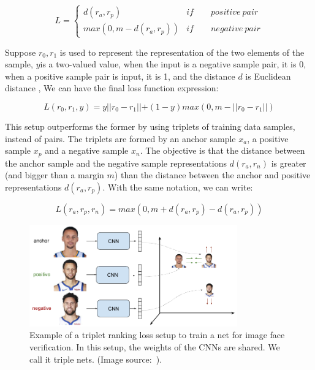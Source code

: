 \begin{equation}
L=\begin{cases}
	d(r_a,r_p) & if \qquad positive\ pair \\
	max(0,m-d(r_a,r_p)) & if \qquad negative\  pair
\end{cases}
\end{equation}

Suppose $r_0,r_1 $ is used to represent the representation of the two elements of the sample, $y$is a two-valued value, when the input is a negative sample pair, it is 0, when a positive sample pair is input, it is 1, and the distance $d$ is Euclidean distance , We can have the final loss function expression:

\begin{equation}
L(r_0,r_1,y)=y\left || r_0-r_1 \right || + (1-y)max(0,m-\left || r_0-r_1 \right ||)
\end{equation}

This setup outperforms the former by using triplets of training data samples, instead of pairs. The triplets are formed by an anchor sample $x_a$, a positive sample $x_p$ and a negative sample $x_n$. The objective is that the distance between the anchor sample and the negative sample representations $d(r_a,r_n)$ is greater (and bigger than a margin $m$) than the distance between the anchor and positive representations $d(r_a,r_p)$. With the same notation, we can write:

\begin{equation}
L(r_a,r_p,r_n)=max(0,m+d(r_a,r_p)-d(r_a,r_p))
\label{equ:ranking_loss}
\end{equation}

\begin{figure}[!htbp]
	\centering
	\includegraphics[width = 0.8\textwidth]{figures/triplet_loss_faces.png}
	\caption[Example of a triplet ranking loss ]
	{ Example of a triplet ranking loss setup to train a net for image face verification. In this setup, the weights of the CNNs are shared. We call it triple nets. (Image source:~\cite{triplet_loss_em}).}
	\label{fig:triplet_ranking_loss}
\end{figure}


